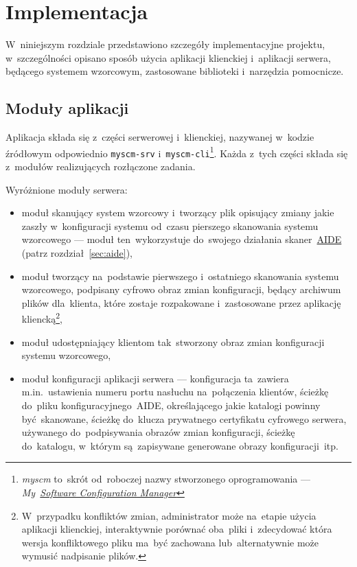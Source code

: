 \documentclass[thesis]{subfiles}
\begin{document}
\chapter{Implementacja}

W~niniejszym rozdziale przedstawiono szczegóły implementacyjne projektu, w~szczególności opisano sposób użycia aplikacji klienckiej i~aplikacji serwera, będącego systemem wzorcowym, zastosowane biblioteki i~narzędzia pomocnicze.


\section{Moduły aplikacji}

Aplikacja składa się z~części serwerowej i~klienckiej, nazywanej w~kodzie źródłowym odpowiednio \texttt{myscm-srv} i~\texttt{myscm-cli}\footnote{\emph{myscm} to~skrót od~roboczej nazwy stworzonego oprogramowania --- \emph{My~\href{https://en.wikipedia.org/wiki/Software_configuration_management}{Software Configuration Manager}}}. Każda z~tych części składa się z~modułów realizujących rozłączone zadania.

Wyróżnione moduły serwera:\mynobreakpar
\begin{itemize}
	\item moduł skanujący system wzorcowy i~tworzący plik opisujący zmiany jakie zaszły w~konfiguracji systemu od~czasu pierszego skanowania systemu wzorcowego --- moduł ten~wykorzystuje do~swojego działania skaner~\hyperref[sec:aide]{AIDE} (patrz rozdział~\ref{sec:aide}),
	\item moduł tworzący na~podstawie pierwszego i~ostatniego skanowania systemu wzorcowego, podpisany cyfrowo obraz zmian konfiguracji, będący archiwum plików dla~klienta, które zostaje rozpakowane i~zastosowane przez aplikację kliencką\footnote{W~przypadku konfliktów zmian, administrator może na~etapie użycia aplikacji klienckiej, interaktywnie porównać oba~pliki i~zdecydować która wersja konfliktowego pliku ma~być zachowana lub~alternatywnie może wymusić nadpisanie plików.},
	\item moduł udostępniający klientom tak~stworzony obraz zmian konfiguracji systemu wzorcowego,
	\item moduł konfiguracji aplikacji serwera --- konfiguracja ta~zawiera m.in.~ustawienia numeru portu nasłuchu na~połączenia klientów, ścieżkę do~pliku konfiguracyjnego~AIDE, określającego jakie katalogi powinny być~skanowane, ścieżkę do~klucza prywatnego certyfikatu cyfrowego serwera, używanego do~podpisywania obrazów zmian konfiguracji, ścieżkę do~katalogu, w~którym są~zapisywane generowane obrazy konfiguracji~itp.
\end{itemize}
\end{document}
